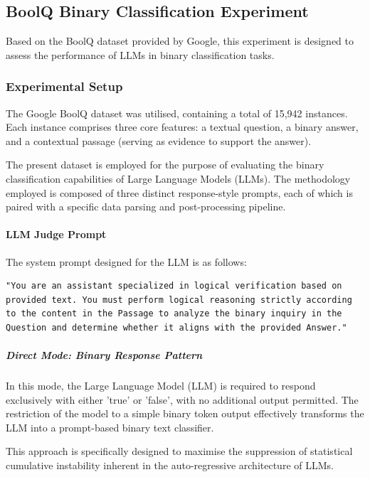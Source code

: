 \subsection{BoolQ Binary Classification Experiment}
Based on the BoolQ dataset \ph{[ref]} provided by Google, this experiment is designed to assess the performance of LLMs in binary classification tasks.

\subsubsection{Experimental Setup}

The Google BoolQ dataset \ph{[ref]} was utilised, containing a total of 15,942 instances. Each instance comprises three core features: a textual question, a binary answer, and a contextual passage (serving as evidence to support the answer).

The present dataset is employed for the purpose of evaluating the binary classification capabilities of Large Language Models (LLMs). The methodology employed is composed of three distinct response-style prompts, each of which is paired with a specific data parsing and post-processing pipeline.

\paragraph{LLM Judge Prompt}

The system prompt designed for the LLM is as follows:

\begin{verbatim}
"You are an assistant specialized in logical verification based on provided text. You must perform logical reasoning strictly according to the content in the Passage to analyze the binary inquiry in the Question and determine whether it aligns with the provided Answer."
\end{verbatim}

\subparagraph{Direct Mode: Binary Response Pattern}
In this mode, the Large Language Model (LLM) is required to respond exclusively with either 'true' or 'false', with no additional output permitted. The restriction of the model to a simple binary token output effectively transforms the LLM into a prompt-based binary text classifier.

This approach is specifically designed to maximise the suppression of statistical cumulative instability inherent in the auto-regressive architecture of LLMs.

